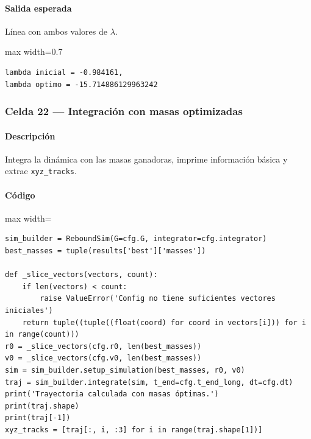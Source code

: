 \paragraph{Salida esperada} Línea con ambos valores de $\lambda$.

\begin{listing}[H]
\caption{Ejemplo Salida}
\begin{adjustbox}{max width=0.7\textwidth}
\begin{minipage}{\textwidth}
\begin{verbatim}
lambda inicial = -0.984161,
lambda optimo = -15.714886129963242
\end{verbatim}
\end{minipage}
\end{adjustbox}
\end{listing}

\subsubsection*{Celda 22 — Integración con masas optimizadas}
\paragraph{Descripción} Integra la dinámica con las masas ganadoras, imprime información básica y extrae \texttt{xyz\_tracks}.
\paragraph{Código}
\begin{listing}[H]
\caption{Celda 22: integración prolongada con masas óptimas}
\begin{adjustbox}{max width=\textwidth}
\begin{minipage}{\textwidth}
\begin{verbatim}
sim_builder = ReboundSim(G=cfg.G, integrator=cfg.integrator)
best_masses = tuple(results['best']['masses'])

def _slice_vectors(vectors, count):
    if len(vectors) < count:
        raise ValueError('Config no tiene suficientes vectores iniciales')
    return tuple((tuple((float(coord) for coord in vectors[i])) for i in range(count)))
r0 = _slice_vectors(cfg.r0, len(best_masses))
v0 = _slice_vectors(cfg.v0, len(best_masses))
sim = sim_builder.setup_simulation(best_masses, r0, v0)
traj = sim_builder.integrate(sim, t_end=cfg.t_end_long, dt=cfg.dt)
print('Trayectoria calculada con masas óptimas.')
print(traj.shape)
print(traj[-1])
xyz_tracks = [traj[:, i, :3] for i in range(traj.shape[1])]
\end{verbatim}
\end{minipage}
\end{adjustbox}
\end{listing}
